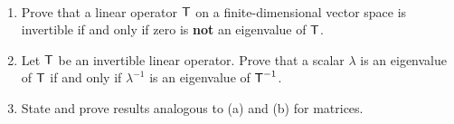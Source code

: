 \begin{exercise} \label{exercise 5.1.9} \ 

\begin{enumerate}
\item Prove that a linear operator \(\textsf{T}\) on a finite-dimensional vector space is invertible if and only if zero is \textbf{not} an eigenvalue of \(\textsf{T}\).

\item Let \(\textsf{T}\) be an invertible linear operator.
Prove that a scalar \(\lambda\) is an eigenvalue of \(\textsf{T}\) if and only if \(\lambda^{-1}\) is an eigenvalue of \(\textsf{T}^{-1}\).
\item State and prove results analogous to (a) and (b) for matrices.
\end{enumerate}
\end{exercise}

